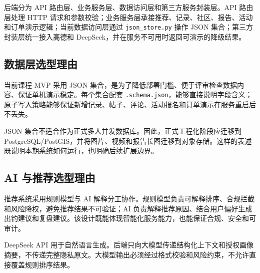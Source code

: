后端分为 API 路由层、业务服务层、数据访问层和第三方服务封装层。API 路由层处理 HTTP 请求和参数校验；业务服务层承接推荐、记录、社区、报告、活动和订单演示逻辑；当前数据访问层通过 \texttt{json\_store.py} 操作 JSON 集合；第三方封装层统一接入高德和 DeepSeek，并在服务不可用时返回可演示的降级结果。

\subsection{数据层选型理由}

当前课程 MVP 采用 JSON 集合，是为了降低部署门槛、便于评审检查数据内容、保证单机演示稳定。每个集合配套 \texttt{.schema.json}，能够直接说明字段含义；原子写入策略能够保证新增记录、帖子、评论、活动报名和订单演示在服务重启后不丢失。

JSON 集合不适合作为正式多人并发数据库。因此，正式工程化阶段应迁移到 PostgreSQL/PostGIS，并将图片、视频和报告长图迁移到对象存储。这样的表述既说明本期系统如何运行，也明确后续扩展边界。

\subsection{AI 与推荐选型理由}

推荐系统采用规则模型与 AI 解释分工协作。规则模型负责可解释排序、合规拦截和风险降权，避免推荐结果不可验证；AI 负责解释推荐原因、结合用户偏好生成出钓建议和复盘建议。该设计既能体现智能化服务能力，也能保证合规、安全和可审计。

DeepSeek API 用于自然语言生成。后端只向大模型传递结构化上下文和授权画像摘要，不传递完整隐私原文。大模型输出必须经过格式校验和风险约束，不允许直接覆盖规则排序结果。
